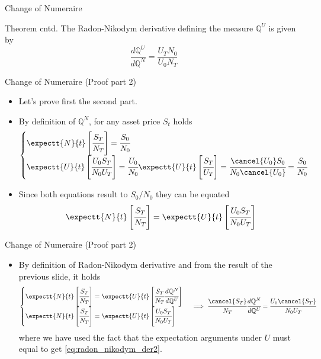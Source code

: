 \documentclass{beamer}
\begin{document}
\begin{frame}{Change of Numeraire}
	\begin{block}{Theorem cntd.}
		The Radon-Nikodym derivative defining the measure $\mathbb{Q}^U$ is given by
		\begin{equation}
			\frac{d\mathbb{Q}^U}{d\mathbb{Q}^N} = \frac{U_T N_0}{U_0 N_T}
			\label{eq:radon_nikodym_der2}
	\end{equation}
	\end{block}
\end{frame}	

\begin{frame}{Change of Numeraire (Proof part 2)}
	\begin{itemize}
		\item Let's prove first the second part.
  		\item By definition of $\mathbb{Q}^N$, for any asset price $S_t$ holds
	  \begin{equation*}
	    \begin{cases} 
	      \expectt{N}{t}\left[\cfrac{S_T}{N_T}\right] = \cfrac{S_0}{N_0} \\
\expectt{U}{t}\left[\cfrac{U_0 S_T}{N_0 U_T}\right] = \cfrac{U_0}{N_0}\expectt{U}{t}\left[\cfrac{S_T}{U_T}\right] = \cfrac{\cancel{U_0} S_0}{N_0 \cancel{U_0}} = \cfrac{S_0}{N_0}
	    \end{cases}
	  \end{equation*}
  	\item Since both equations result to $S_0/N_0$ they can be equated
  	\begin{equation*}
  	\expectt{N}{t}\left[\cfrac{S_T}{N_T}\right] = \expectt{U}{t}\left[\cfrac{U_0 S_T}{N_0 U_T}\right]
  	\end{equation*}
  	\end{itemize} 
\end{frame}

\begin{frame}{Change of Numeraire (Proof part 2)}
	\begin{itemize}
	\item By definition of Radon-Nikodym derivative and from the result of the previous slide, it holds
  \begin{equation*}
  	\begin{cases}
    \expectt{N}{t}\left[\cfrac{S_T}{N_T}\right] =\expectt{U}{t}\left[\cfrac{S_T}{N_T} \cfrac{d\mathbb{Q}^N}{d\mathbb{Q}^U}\right] \\
    \expectt{N}{t}\left[\cfrac{S_T}{N_T}\right] =\expectt{U}{t}\left[\cfrac{U_0 S_T}{N_0 U_T}\right]
    \end{cases}\implies
	\cfrac{\cancel{S_T}}{N_T} \cfrac{d\mathbb{Q}^N}{d\mathbb{Q}^U} = \cfrac{U_0 \cancel{S_T}}{N_0 U_T}
  \end{equation*}
	where we have used the fact that the expectation arguments under $U$ must equal to get \cref{eq:radon_nikodym_der2}. 
  \end{itemize}
\myendproof
\end{frame}
\end{document}
